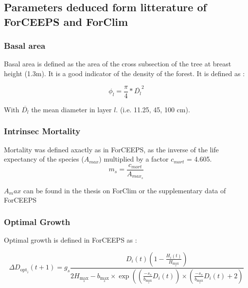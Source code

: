 \documentclass{article}
\begin{document}
\subsection{Parameters deduced form litterature of ForCEEPS and ForClim}

\subsubsection{Basal area}

Basal area is defined as the area of the cross subsection of the tree at breast height (1.3m). It is a good indicator of the density of the forest. It is defined as : 

\begin{equation}
    \phi_{l} = \frac{\pi}{4} * \overline{D_{l}}^2
\end{equation}

With $\overline{D_{l}}$ the mean diameter in layer $l$. (i.e. 11.25, 45, 100 cm).\\

\subsubsection{Intrinsec Mortality}

Mortality was defined axactly as in ForCEEPS, as the inverse of the life expectancy of the species ($A_{max}$) multiplied by a factor $c_{mort}$ = 4.605.
\begin{equation}
    m_s = \frac{c_{mort}}{A_{max_s}}
\end{equation}

$A_max$ can be found in the thesis on ForClim  \autocite{bugmannEcologyMountainousForests1965} or the supplementary data of ForCEEPS  \autocite{morinForestSuccessionGap2021}

\subsubsection{Optimal Growth}

Optimal growth is defined in ForCEEPS  \autocite{morinForestSuccessionGap2021} as :

\begin{equation}
    \Delta D_{\mathrm{opt}_i}(t+1)=g_s \frac{D_i(t)\left(1-\frac{H_i(t)}{H_{\max _s}}\right)}{2 H_{\max _s}-b_{\max _s} \times \exp \left(\left(\frac{-s_s}{b_{\max _s}} D_i(t)\right) \times\left(\frac{-s_s}{b_{\max _s}} D_i(t)+2\right)\right.}
\end{equation}
\end{document}
